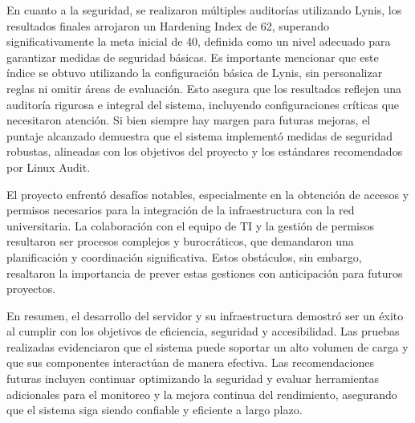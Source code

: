 En cuanto a la seguridad, se realizaron múltiples auditorías utilizando Lynis, los resultados finales arrojaron un Hardening Index de 62, superando significativamente la meta inicial de 40, definida como un nivel adecuado para garantizar medidas de seguridad básicas. Es importante mencionar que este índice se obtuvo utilizando la configuración básica de Lynis, sin personalizar reglas ni omitir áreas de evaluación. Esto asegura que los resultados reflejen una auditoría rigurosa e integral del sistema, incluyendo configuraciones críticas que necesitaron atención. Si bien siempre hay margen para futuras mejoras, el puntaje alcanzado demuestra que el sistema implementó medidas de seguridad robustas, alineadas con los objetivos del proyecto y los estándares recomendados por Linux Audit.

El proyecto enfrentó desafíos notables, especialmente en la obtención de accesos y permisos necesarios para la integración de la infraestructura con la red universitaria. La colaboración con el equipo de TI y la gestión de permisos resultaron ser procesos complejos y burocráticos, que demandaron una planificación y coordinación significativa. Estos obstáculos, sin embargo, resaltaron la importancia de prever estas gestiones con anticipación para futuros proyectos.

En resumen, el desarrollo del servidor y su infraestructura demostró ser un éxito al cumplir con los objetivos de eficiencia, seguridad y accesibilidad. Las pruebas realizadas evidenciaron que el sistema puede soportar un alto volumen de carga y que sus componentes interactúan de manera efectiva. Las recomendaciones futuras incluyen continuar optimizando la seguridad y evaluar herramientas adicionales para el monitoreo y la mejora continua del rendimiento, asegurando que el sistema siga siendo confiable y eficiente a largo plazo.
